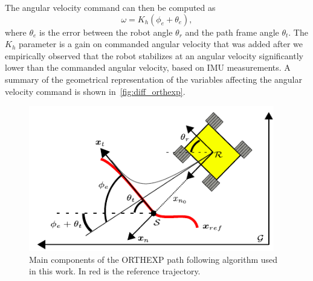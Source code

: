 The angular velocity command can then be computed as %
\begin{equation}
\label{eq:exp_PD}
	\omega = K_h (\phi_e + \theta_e),
\end{equation}
where $\theta_e$ is the error between the robot angle $\theta_r$ and the path frame angle $\theta_t$.
The $K_h$ parameter is a gain on commanded angular velocity that was added after we empirically observed that the robot stabilizes at an angular velocity significantly lower than the commanded angular velocity, based on \ac{IMU} measurements.
A summary of the geometrical representation of the variables affecting the angular velocity command is shown in~\autoref{fig:diff_orthexp}.

\begin{figure} [htpb]
	\centering
	\includegraphics[height=2.5in]{figs/path_follower/orthexp.pdf}
	\caption{Main components of the \ac{ORTHEXP} path following algorithm used in this work.
	In red is the reference trajectory.}
	\label{fig:diff_orthexp}
\end{figure}

